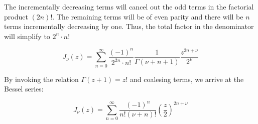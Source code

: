 \documentclass[12pt]{article}%
\newcommand{\infsum}[1][0]{\sum^{\infty}_{n = {#1}}}
\begin{document}
\begin{enumerate}
     The incrementally decreasing terms will cancel out the odd terms in the factorial product $(2n)!$. The remaining terms will be of even parity and there will be $n$ terms incrementally decreasing by one. Thus, the total factor in the denominator will simplify to $2^n \cdot n!$

     \[ J_\nu(z) = \infsum \frac{(-1)^n}{2^{2n}\cdot n!} \frac{1}{\Gamma(\nu + n + 1)} \frac{z^{2n+\nu}}{2^\nu} \]

     By invoking the relation $\Gamma(z+1) = z!$ and coalesing terms, we arrive at the Bessel series:

     \[J_\nu(z) = \infsum \frac{(-1)^n}{n!(\nu + n)!} \left(\frac{z}{2}\right)^{2n + \nu} \]



 \end{enumerate}
\end{document}
